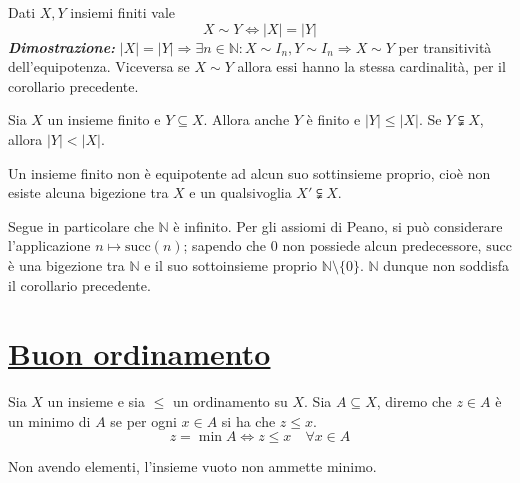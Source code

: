 \documentclass[oneside]{book}
\begin{document}
\begin{tcolorbox}[title={Condizione di equipotenza espressa in termini di cardinalità}]
Dati $X,Y$ insiemi finiti vale
\[ X\sim Y \Longleftrightarrow |X|=|Y| \]
\textit{\textbf{Dimostrazione:}} $|X|=|Y|\Longrightarrow \exists n\in\mathbb{N}:
X\sim I_n, Y\sim I_n\Longrightarrow X\sim Y$ per transitività dell'equipotenza.
Viceversa se $X\sim Y$ allora essi hanno la stessa cardinalità, per il
corollario precedente.
\end{tcolorbox}

\begin{tcolorbox}[title={Cardinalità di sottoinsiemi finiti}]
Sia $X$ un insieme finito e $Y\subseteq X$. Allora anche
$Y$ è finito e $|Y|\leq|X|$. Se $Y\subsetneqq X$, allora
$|Y|<|X|$.
\end{tcolorbox}

\begin{tcolorbox}[colback=green!30, colframe=green!30!black, title={Equipotenza tra insieme finito e sottoinsieme}]
Un insieme finito non è equipotente ad alcun suo sottinsieme proprio,
cioè non esiste alcuna bigezione tra $X$ e un qualsivoglia $X'\subsetneqq X$.
\end{tcolorbox}

\begin{osservaz}
Segue in particolare che $\mathbb{N}$ è
infinito. Per gli assiomi di Peano, si può considerare
l'applicazione $n\mapsto \text{succ}(n)$; sapendo che 0 non
possiede alcun predecessore, $\text{succ}$ è una bigezione
tra $\mathbb{N}$ e il suo sottoinsieme proprio $\mathbb{N}\setminus\{0\}$.
$\mathbb{N}$ dunque non soddisfa il corollario precedente.
\end{osservaz}





\section{\underline{Buon ordinamento}}
\begin{tcolorbox}[colback=yellow!30, colframe=yellow!30!black, title=Minimo]
Sia $X$ un insieme e sia $\leq$ un ordinamento su $X$. Sia $A \subseteq X$, diremo
che $z \in A$ è un minimo di $A$ se per ogni $x \in A$ si ha che $z \leq x$.
\[ z = \min A \Longleftrightarrow z \leq x \quad \forall x \in A \]
\end{tcolorbox}

\begin{osservaz}
Non avendo elementi, l'insieme vuoto non ammette minimo.
\end{osservaz}
\end{document}
